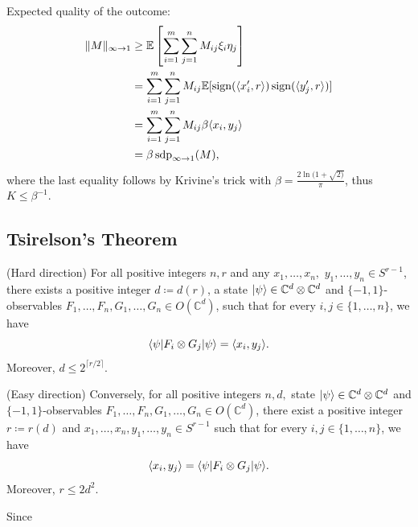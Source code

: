 	\begin{frame}
		\begin{pbmr}
			Expected quality of the outcome:
			\begin{align*}
				 \Vert {M} \Vert_{\infty\to 1} &\geq \mathbb{E}\left[\sum_{i=1}^m\sum_{j=1}^n M_{ij}\xi_i\eta_j\right]\\
				&= \sum_{i=1}^m\sum_{j=1}^n M_{ij} \mathbb{E}[\operatorname{sign}(\langle{x_i^\prime},{r}\rangle) \operatorname{sign}(\langle{y_j^\prime},{r}\rangle)] \\
				&=\sum_{i=1}^m\sum_{j=1}^n M_{ij}\beta \langle{x_i},{y_j}\rangle \\
				&=\beta \operatorname{sdp}_{\infty\to 1}(M),
			\end{align*}
			where the last equality follows by Krivine's trick with $\beta = \frac{2\ln(1+\sqrt{2)}}{\pi}$, thus $K\leq \beta^{-1}$.
		\end{pbmr}
	\end{frame}

\subsection{Tsirelson's Theorem}
\frame{\tableofcontents[currentsubsection]}

	\begin{frame}
		\begin{theo}[Tsirelson] \label{theo:Tsirelson}
			(Hard direction) For all positive integers $n, r$ and any $x_1,\dots,x_n,$ $y_1,\dots,y_n\in S^{r-1}$, there exists a positive integer $d\coloneqq d(r)$, a state $\vert {\psi} \rangle\in\mathbb{C}^d\otimes\mathbb{C}^d$ and $\{-1,1\}$-observables $F_1,\dots,F_n,G_1,\dots,G_n\in O(\mathbb{C}^d)$, such that for every $i,j\in\{1,\dots,n\}$, we have
			\begin{equation}
				\langle {\psi} \vert F_i\otimes G_j \vert {\psi} \rangle = \langle{x_i},{y_j}\rangle.
			\end{equation}
			Moreover, $d\leq 2^{\lceil r/2 \rceil}$.
			
			(Easy direction) Conversely, for all positive integers $n,d,$ state $\vert {\psi} \rangle\in \mathbb{C}^d\otimes\mathbb{C}^d$ and $\{-1,1\}$-observables $F_1,\dots,F_n,G_1,\dots,G_n\in O(\mathbb{C}^d)$, there exist a positive integer $r\coloneqq r(d)$ and $x_1,\dots,x_n,y_1,\dots,y_n\in S^{r-1}$ such that for every $i,j\in\{1,\dots,n\}$, we have
			\begin{equation}
				\langle{x_i},{y_j}\rangle = \langle {\psi} \vert F_i\otimes G_j \vert {\psi} \rangle.
			\end{equation}
			Moreover, $r\leq 2d^2$.
		\end{theo}
	\end{frame}
	\begin{frame}
		Since 
	\end{frame}

